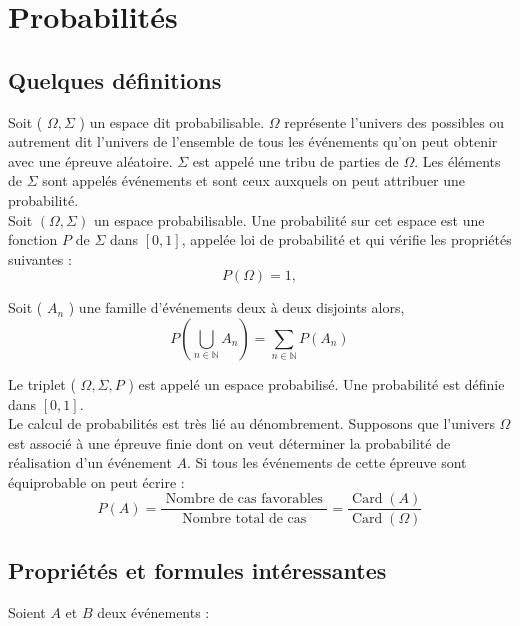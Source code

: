 \chapter{Probabilités}

\section{Quelques définitions}

Soit ( \(\Omega, \Sigma\) ) un espace dit probabilisable. \(\Omega\) représente l'univers des possibles ou autrement dit l'univers de l'ensemble de tous les événements qu'on peut obtenir avec une épreuve aléatoire. \(\Sigma\) est appelé une tribu de parties de \(\Omega\). Les éléments de \(\Sigma\) sont appelés événements et sont ceux auxquels on peut attribuer une probabilité.\\

Soit \((\Omega, \Sigma)\) un espace probabilisable. Une probabilité sur cet espace est une fonction \(P\) de \(\Sigma\) dans \([0,1]\), appelée loi de probabilité et qui vérifie les propriétés suivantes :
\[
P(\Omega)=1,
\]

Soit ( \(A_{n}\) ) une famille d'événements deux à deux disjoints alors,
\[
P\left(\bigcup_{n \in \mathbb{N}} A_{n}\right)=\sum_{n \in \mathbb{N}} P\left(A_{n}\right)
\]

Le triplet ( \(\Omega, \Sigma, P\) ) est appelé un espace probabilisé. Une probabilité est définie dans \([0,1]\).\\

Le calcul de probabilités est très lié au dénombrement. Supposons que l'univers \(\Omega\) est associé à une épreuve finie dont on veut déterminer la probabilité de réalisation d'un événement \(A\). Si tous les événements de cette épreuve sont équiprobable on peut écrire :
\[
P(A)=\frac{\text { Nombre de cas favorables }}{\text { Nombre total de cas }}=\frac{\operatorname{Card}(A)}{\operatorname{Card}(\Omega)}
\]

\section{Propriétés et formules intéressantes}

Soient \(A\) et \(B\) deux événements :

